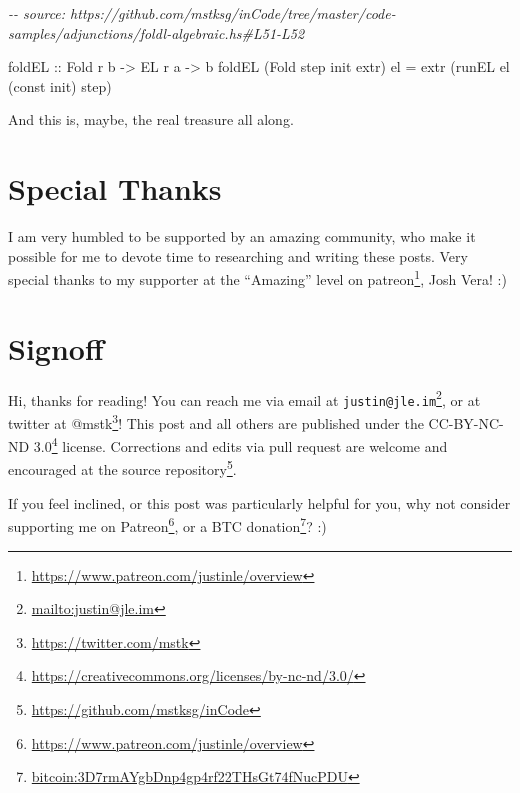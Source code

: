 \documentclass[]{article}
\newenvironment{Shaded}{}{}
\newcommand{\CommentTok}[1]{\textcolor[rgb]{0.38,0.63,0.69}{\textit{#1}}}
\newcommand{\DataTypeTok}[1]{\textcolor[rgb]{0.56,0.13,0.00}{#1}}
\newcommand{\FunctionTok}[1]{\textcolor[rgb]{0.02,0.16,0.49}{#1}}
\newcommand{\NormalTok}[1]{#1}
\newcommand{\OtherTok}[1]{\textcolor[rgb]{0.00,0.44,0.13}{#1}}
\renewcommand{\href}[2]{#2\footnote{\url{#1}}}
\begin{document}
\begin{Shaded}
\begin{Highlighting}[]
\CommentTok{{-}{-} source: https://github.com/mstksg/inCode/tree/master/code{-}samples/adjunctions/foldl{-}algebraic.hs\#L51{-}L52}

\OtherTok{foldEL ::} \DataTypeTok{Fold}\NormalTok{ r b }\OtherTok{{-}>} \DataTypeTok{EL}\NormalTok{ r a }\OtherTok{{-}>}\NormalTok{ b}
\NormalTok{foldEL (}\DataTypeTok{Fold}\NormalTok{ step }\FunctionTok{init}\NormalTok{ extr) el }\OtherTok{=}\NormalTok{ extr (runEL el (}\FunctionTok{const} \FunctionTok{init}\NormalTok{) step)}
\end{Highlighting}
\end{Shaded}

And this is, maybe, the real treasure all along.

\hypertarget{special-thanks}{%
\section{Special Thanks}\label{special-thanks}}

I am very humbled to be supported by an amazing community, who make it possible
for me to devote time to researching and writing these posts. Very special
thanks to my supporter at the ``Amazing'' level on
\href{https://www.patreon.com/justinle/overview}{patreon}, Josh Vera! :)

\hypertarget{signoff}{%
\section{Signoff}\label{signoff}}

Hi, thanks for reading! You can reach me via email at
\href{mailto:justin@jle.im}{\nolinkurl{justin@jle.im}}, or at twitter at
\href{https://twitter.com/mstk}{@mstk}! This post and all others are published
under the \href{https://creativecommons.org/licenses/by-nc-nd/3.0/}{CC-BY-NC-ND
3.0} license. Corrections and edits via pull request are welcome and encouraged
at \href{https://github.com/mstksg/inCode}{the source repository}.

If you feel inclined, or this post was particularly helpful for you, why not
consider \href{https://www.patreon.com/justinle/overview}{supporting me on
Patreon}, or a \href{bitcoin:3D7rmAYgbDnp4gp4rf22THsGt74fNucPDU}{BTC donation}?
:)
\end{document}
